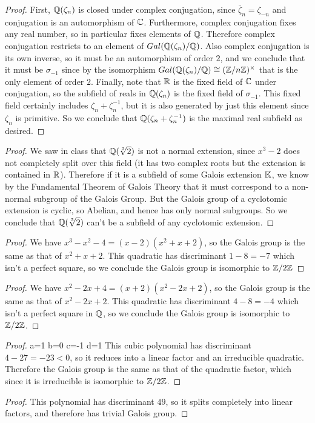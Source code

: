 \documentclass[11pt]{article}
\begin{document}
\begin{proof}
  First, $\mathbb{Q}(\zeta_n)$ is closed under complex conjugation, since $\bar\zeta_n = \zeta_{-n}$ and conjugation is an automorphism of $\mathbb{C}$.
  Furthermore, complex conjugation fixes any real number, so in particular fixes elements of $\mathbb{Q}$.
  Therefore complex conjugation restricts to an element of $Gal(\mathbb{Q}(\zeta_n)/\mathbb{Q})$.
  Also complex conjugation is its own inverse, so it must be an automorphism of order $2$, and we conclude that it must be $\sigma_{-1}$ since by the isomorphism $Gal(\mathbb{Q}(\zeta_n)/\mathbb{Q}) \cong (\mathbb{Z}/n\mathbb{Z})^\times$ that is the only element of order $2$.
  Finally, note that $\mathbb{R}$ is the fixed field of $\mathbb{C}$ under conjugation, so the subfield of reals in $\mathbb{Q}(\zeta_n)$ is the fixed field of $\sigma_{-1}$.
  This fixed field certainly includes $\zeta_n + \zeta_n^{-1}$, but it is also generated by just this element since $\zeta_n$ is primitive.
  So we conclude that $\mathbb{Q}(\zeta_n + \zeta_n^{-1})$ is the maximal real subfield as desired.
\end{proof}


\begin{proof}
  We saw in class that $\mathbb{Q}(\sqrt[3]{2})$ is not a normal extension, since $x^3-2$ does not completely split over this field (it has two complex roots but the extension is contained in $\mathbb{R}$).
  Therefore if it is a subfield of some Galois extension $\mathbb{K}$, we know by the Fundamental Theorem of Galois Theory that it must correspond to a non-normal subgroup of the Galois Group.
  But the Galois group of a cyclotomic extension is cyclic, so Abelian, and hence has only normal subgroups.
  So we conclude that $\mathbb{Q}(\sqrt[3]{2})$ can't be a subfield of any cyclotomic extension.
\end{proof}


\begin{proof}
  We have $x^3-x^2-4 = (x-2)(x^2+x+2)$, so the Galois group is the same as that of $x^2+x+2$.
  This quadratic has discriminant $1-8=-7$ which isn't a perfect square, so we conclude the Galois group is isomorphic to $\mathbb{Z}/2\mathbb{Z}$
\end{proof}

\begin{proof}
  We have $x^2-2x+4 = (x+2)(x^2-2x+2)$, so the Galois group is the same as that of $x^2-2x+2$.
  This quadratic has discriminant $4-8=-4$ which isn't a perfect square in $\mathbb{Q}$, so we conclude the Galois group is isomorphic to $\mathbb{Z}/2\mathbb{Z}$.
\end{proof}

\begin{proof}
  a=1 b=0 c=-1 d=1
  This cubic polynomial has discriminant $4-27 = -23 < 0$, so it reduces into a linear factor and an irreducible quadratic.
  Therefore the Galois group is the same as that of the quadratic factor, which since it is irreducible is isomorphic to $\mathbb{Z}/2\mathbb{Z}$.
\end{proof}

\begin{proof}
  This polynomial has discriminant $49$, so it splits completely into linear factors, and therefore has trivial Galois group.
\end{proof}
\end{document}
